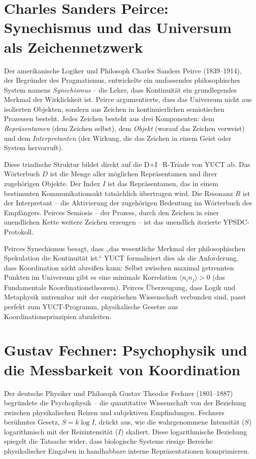 \documentclass[12pt,a4paper]{article}
\begin{document}
	\section{Charles Sanders Peirce: Synechismus und das Universum als Zeichennetzwerk}
	
	Der amerikanische Logiker und Philosoph Charles Sanders Peirce (1839–1914), der Begründer des Pragmatismus, entwickelte ein umfassendes philosophisches System namens \emph{Synechismus} – die Lehre, dass Kontinuität ein grundlegendes Merkmal der Wirklichkeit ist. Peirce argumentierte, dass das Universum nicht aus isolierten Objekten, sondern aus Zeichen in kontinuierlichen semiotischen Prozessen besteht. Jedes Zeichen besteht aus drei Komponenten: dem \emph{Repräsentamen} (dem Zeichen selbst), dem \emph{Objekt} (worauf das Zeichen verweist) und dem \emph{Interpretanten} (der Wirkung, die das Zeichen in einem Geist oder System hervorruft).
	
	Diese triadische Struktur bildet direkt auf die D+I·R-Triade von YUCT ab. Das Wörterbuch \(D\) ist die Menge aller möglichen Repräsentamen und ihrer zugehörigen Objekte. Der Index \(I\) ist das Repräsentamen, das in einem bestimmten Kommunikationsakt tatsächlich übertragen wird. Die Resonanz \(R\) ist der Interpretant – die Aktivierung der zugehörigen Bedeutung im Wörterbuch des Empfängers. Peirces Semiosis – der Prozess, durch den Zeichen in einer unendlichen Kette weitere Zeichen erzeugen – ist das unendlich iterierte YPSDC-Protokoll.
	
	Peirces Synechismus besagt, dass „das wesentliche Merkmal der philosophischen Spekulation die Kontinuität ist.“ YUCT formalisiert dies als die Anforderung, dass Koordination nicht abreißen kann: Selbst zwischen maximal getrennten Punkten im Universum gibt es eine minimale Korrelation \(\langle n_i n_j \rangle > 0\) (das Fundamentale Koordinationstheorem). Peirces Überzeugung, dass Logik und Metaphysik untrennbar mit der empirischen Wissenschaft verbunden sind, passt perfekt zum YUCT-Programm, physikalische Gesetze aus Koordinationsprinzipien abzuleiten.
	
	\section{Gustav Fechner: Psychophysik und die Messbarkeit von Koordination}
	
	Der deutsche Physiker und Philosoph Gustav Theodor Fechner (1801–1887) begründete die Psychophysik – die quantitative Wissenschaft von der Beziehung zwischen physikalischen Reizen und subjektiven Empfindungen. Fechners berühmtes Gesetz, \(S = k \log I\), drückt aus, wie die wahrgenommene Intensität (\(S\)) logarithmisch mit der Reizintensität (\(I\)) skaliert. Diese logarithmische Beziehung spiegelt die Tatsache wider, dass biologische Systeme riesige Bereiche physikalischer Eingaben in handhabbare interne Repräsentationen komprimieren.
	
\end{document}

